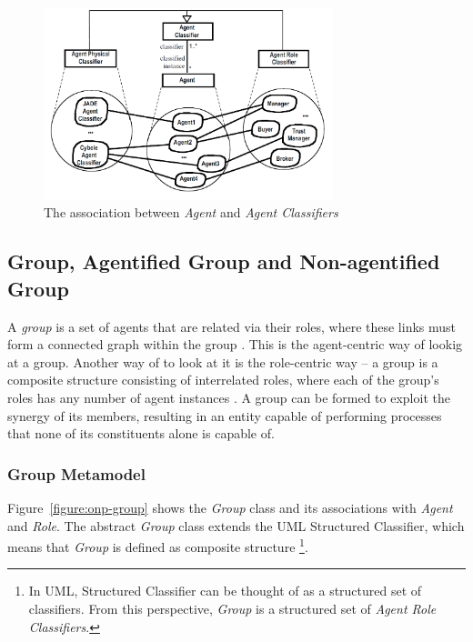\begin{figure}[ht]
	\centering
	\includegraphics[width=0.75\textwidth]{images/onp/agent-agent-classifier-association.png}
	\caption{The association between \textit{Agent} and \textit{Agent Classifiers}}
	\label{figure:onp-agent-agent-classifier-association}
\end{figure}

\subsection{Group, Agentified Group and Non-agentified Group}

A \textit{group} is a set of agents that are related via their roles, where these links must form
a connected graph within the group \cite{Odell05}.
This is the agent-centric way of lookig at a group.
Another way of to look at it is the role-centric way -- a group is a composite structure consisting of interrelated roles, where each of the group's roles has any number of agent instances \cite{Odell05}.
A group can be formed to exploit the synergy of its members, resulting in an entity capable of performing processes that none of its constituents alone is capable of.

\subsubsection*{Group Metamodel}

Figure~\ref{figure:onp-group} shows the \textit{Group} class and its associations with \textit{Agent} and \textit{Role}.
The abstract \textit{Group} class extends the UML Structured Classifier, which means that \textit{Group} is defined as composite structure
\footnote{In UML, Structured Classifier can be thought of as a structured set of classifiers. From this perspective, \textit{Group} is a structured set of \textit{Agent Role Classifiers}.}.

